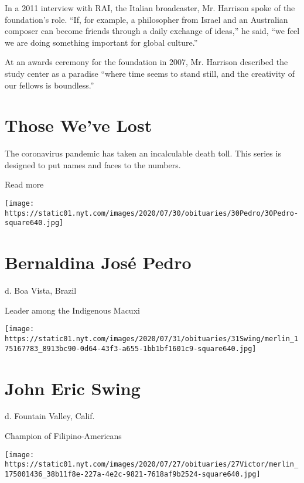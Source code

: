 In a 2011 interview with RAI, the Italian broadcaster, Mr. Harrison
spoke of the foundation's role. ``If, for example, a philosopher from
Israel and an Australian composer can become friends through a daily
exchange of ideas,'' he said, ``we feel we are doing something important
for global culture.''

At an awards ceremony for the foundation in 2007, Mr. Harrison described
the study center as a paradise ``where time seems to stand still, and
the creativity of our fellows is boundless.''

\href{https://www.nytimes.com/interactive/2020/obituaries/people-died-coronavirus-obituaries.html?action=click\&pgtype=Article\&state=default\&region=BELOW_MAIN_CONTENT\&context=covid_obits_promo}{}

\hypertarget{those-weve-lost}{%
\section{Those We've Lost}\label{those-weve-lost}}

The coronavirus pandemic has taken an incalculable death toll. This
series is designed to put names and faces to the numbers.

Read more

\texttt{[image: https://static01.nyt.com/images/2020/07/30/obituaries/30Pedro/30Pedro-square640.jpg]}

\hypertarget{bernaldina-josuxe9-pedro}{%
\section{Bernaldina José Pedro}\label{bernaldina-josuxe9-pedro}}

d. Boa Vista, Brazil

Leader among the Indigenous Macuxi

\texttt{[image: https://static01.nyt.com/images/2020/07/31/obituaries/31Swing/merlin\_175167783\_8913bc90-0d64-43f3-a655-1bb1bf1601c9-square640.jpg]}

\hypertarget{john-eric-swing}{%
\section{John Eric Swing}\label{john-eric-swing}}

d. Fountain Valley, Calif.

Champion of Filipino-Americans

\texttt{[image: https://static01.nyt.com/images/2020/07/27/obituaries/27Victor/merlin\_175001436\_38b11f8e-227a-4e2c-9821-7618af9b2524-square640.jpg]}


